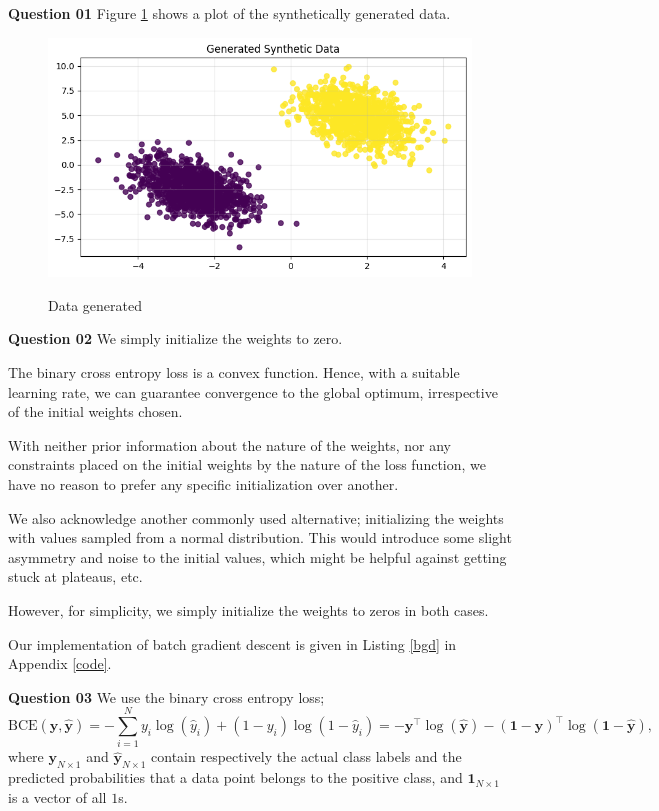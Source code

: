 \documentclass{article}[a4paper]
\begin{document}
	\textbf{Question 01} Figure \ref{q3_1} shows a plot of the synthetically generated data.

	\begin{figure}[H]
		\centering
		\includegraphics[width=0.8\linewidth]{images/q3_1.png}
		\label{q3_1}
		\caption{Data generated}
	\end{figure}

	\textbf{Question 02} We simply initialize the weights to zero.
	
	The binary cross entropy loss is a convex function. Hence, with a suitable learning rate, we can guarantee convergence to the global optimum, irrespective of the initial weights chosen.
	
	With neither prior information about the nature of the weights, nor any constraints placed on the initial weights by the nature of the loss function, we have no reason to prefer any specific initialization over another.

	We also acknowledge another commonly used alternative; initializing the weights with values sampled from a normal distribution. This would introduce some slight asymmetry and noise to the initial values, which might be helpful against getting stuck at plateaus, etc. 
	
	However, for simplicity, we simply initialize the weights to zeros in both cases.

	Our implementation of batch gradient descent is given in Listing \ref{bgd} in Appendix \ref{code}.
	\medskip

	\textbf{Question 03} We use the binary cross entropy loss; \[
		\text{BCE}\left(\mathbf{y}, \hat{\mathbf{y}}\right)
		=
		-\sum_{i = 1}^N
			y_i \log\left( \hat{y}_i \right)
			+
			\left( 1 - y_i \right) \log\left( 1 - \hat{y}_i \right)
		=
		-\mathbf{y}^\top \log\left( \hat{\mathbf{y}} \right)
		-\left(\mathbf{1} - \mathbf{y}\right)^\top \log\left( \mathbf{1} - \hat{\mathbf{y}} \right),
	\]
	where $\mathbf{y}_{N \times 1}$ and $\hat{\mathbf{y}}_{N \times 1}$ contain respectively the actual class labels and the predicted probabilities that a data point belongs to the positive class, and $\mathbf{1}_{N \times 1}$ is a vector of all $1$s.
\end{document}
